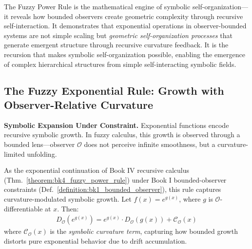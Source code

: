 The Fuzzy Power Rule is the mathematical engine of symbolic self-organization---it reveals how bounded observers create geometric complexity through recursive self-interaction. It demonstrates that exponential operations in observer-bounded systems are not simple scaling but \textit{geometric self-organization processes} that generate emergent structure through recursive curvature feedback. It is the recursion that makes symbolic self-organization possible, enabling the emergence of complex hierarchical structures from simple self-interacting symbolic fields.

\subsection{The Fuzzy Exponential Rule: Growth with Observer-Relative Curvature}
\label{subsec:bk4_fuzzy_exponential_rule}

\textbf{Symbolic Expansion Under Constraint.} Exponential functions encode recursive symbolic growth. In fuzzy calculus, this growth is observed through a bounded lens---observer $\mathcal{O}$ does not perceive infinite smoothness, but a curvature-limited unfolding.

\begin{theorem}
\label{theorem:bk4_fuzzy_exponential_rule}
As the exponential continuation of Book IV recursive calculus (Thm.~\ref{theorem:bk4_fuzzy_power_rule}) under Book I bounded-observer constraints (Def.~\ref{definition:bk1_bounded_observer}), this rule captures curvature-modulated symbolic growth.
Let $f(x) = e^{g(x)}$, where $g$ is $\mathcal{O}$-differentiable at $x$. Then:
\begin{align}
D_{\mathcal{O}}(e^{g(x)}) = e^{g(x)} \cdot D_{\mathcal{O}}(g(x)) + \mathcal{C}_{\mathcal{O}}(x)
\end{align}
where $\mathcal{C}_{\mathcal{O}}(x)$ is the \emph{symbolic curvature term}, capturing how bounded growth distorts pure exponential behavior due to drift accumulation.
\end{theorem}

